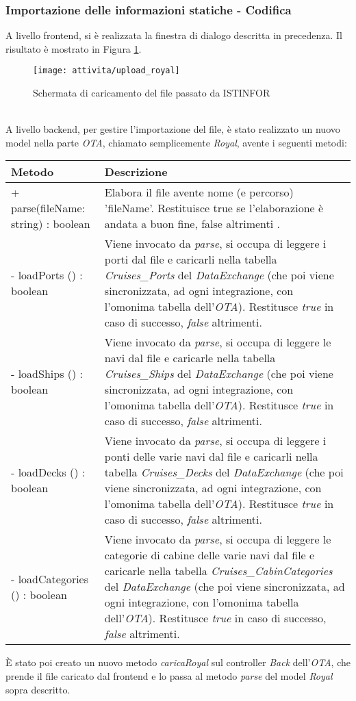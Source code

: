 \subsubsection{Importazione delle informazioni statiche - Codifica}
A livello frontend, si è realizzata la finestra di dialogo descritta in precedenza. Il risultato è mostrato in Figura \ref{figura:upload-fibos}.
\begin{figure}[!h] 
	\centering 
	\texttt{[image: attivita/upload\_royal]} 
	\caption{Schermata di caricamento del file passato da ISTINFOR}
	\label{figura:upload-fibos}
\end{figure} \\
A livello backend, per gestire l'importazione del file, è stato realizzato un nuovo model nella parte \textit{OTA}, chiamato semplicemente \textit{Royal}, avente i seguenti metodi:
\begin{center}
	\def\arraystretch{1.5}
	\begin{longtable}{ >{\raggedright}p{5.5cm} p{6.8cm}} 
		\hline
		\textbf{Metodo} & \textbf{Descrizione} \\ \hline
		+ parse(fileName: string) : boolean & Elabora il file avente nome (e percorso) 'fileName'. Restituisce true se l'elaborazione è andata a buon fine, false altrimenti .\\
		\hline
		- loadPorts () : boolean & Viene invocato da \textit{parse}, si occupa di leggere i porti dal file e caricarli nella tabella \textit{Cruises\_Ports} del \textit{DataExchange} (che poi viene sincronizzata, ad ogni integrazione, con l'omonima tabella dell'\textit{OTA}). Restitusce \textit{true} in caso di successo, \textit{false} altrimenti.\\
		\hline
		- loadShips () : boolean & Viene invocato da \textit{parse}, si occupa di leggere le navi dal file e caricarle nella tabella \textit{Cruises\_Ships} del \textit{DataExchange} (che poi viene sincronizzata, ad ogni integrazione, con l'omonima tabella dell'\textit{OTA}). Restitusce \textit{true} in caso di successo, \textit{false} altrimenti.\\
		\hline
		- loadDecks () : boolean & Viene invocato da \textit{parse}, si occupa di leggere i ponti delle varie navi dal file e caricarli nella tabella \textit{Cruises\_Decks} del \textit{DataExchange} (che poi viene sincronizzata, ad ogni integrazione, con l'omonima tabella dell'\textit{OTA}). Restitusce \textit{true} in caso di successo, \textit{false} altrimenti.\\
		\hline
		- loadCategories () : boolean & Viene invocato da \textit{parse}, si occupa di leggere le categorie di cabine delle varie navi dal file e caricarle nella tabella \textit{Cruises\_CabinCategories} del \textit{DataExchange} (che poi viene sincronizzata, ad ogni integrazione, con l'omonima tabella dell'\textit{OTA}). Restitusce \textit{true} in caso di successo, \textit{false} altrimenti.\\
		\hline
	\end{longtable}
\end{center}
È stato poi creato un nuovo metodo \textit{caricaRoyal} sul controller \textit{Back} dell'\textit{OTA}, che prende il file caricato dal frontend e lo passa al metodo \textit{parse} del model \textit{Royal} sopra descritto.

